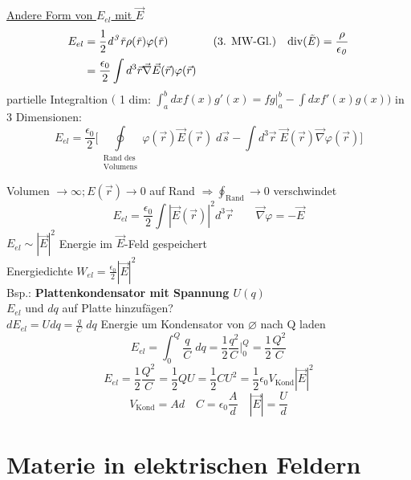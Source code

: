 \documentclass[titlepage,12pt,a4paper,ngerman]{report}
\newcommand{\tx}[1]{\textrm{#1}}
\begin{document}
\underline{Andere Form von $E_{el}$ mit $ \vec{E}$}
\begin{align*}
E_{el} &= \frac{1}{2} \it d^3\vec{r} \rho(\vec{r}) \varphi(\vec{r}) \qquad \qquad \tx{(3. MW-Gl.)} \quad \tx{div}(\vec{E}) = \frac{\rho}{\epsilon_0}\\
&= \frac{\epsilon_0}{2} \int d^3 \vec{r} \vec{\nabla} \vec{E}(\vec{r}) \varphi(\vec{r})
\end{align*}
partielle Integraltion $\bigg($ 1 dim: $\int_a^b dx f(x) g'(x) = fg \bigg \vert _a^b - \int dx f'(x) g(x) \bigg)$
in 3 Dimensionen:
$$ E_{el}= \frac{\epsilon_0}{2} \bigg[ \oint \limits _{\substack{\tx{Rand des} \\ \tx{Volumens}}} \varphi(\vec{r}) \vec{E}(\vec{r}) \; d\vec{s} - \int d^3\vec{r}\; \vec{E}(\vec{r}) \vec{\nabla} \varphi(\vec{r}) \bigg]$$

Volumen $\rightarrow \infty ; E(\vec{r}) \rightarrow 0$ auf Rand $ \Rightarrow \oint_{\tx{Rand}} \rightarrow 0 $ verschwindet
$$E_{el} = \frac{\epsilon_0}{2} \int |\vec{E}(\vec{r})|^2 d^3 \vec{r}\qquad \vec{\nabla} \varphi = - \vec{E}$$
$E_{el} \sim |\vec{E}|^2$ Energie im $\vec{E}$-Feld gespeichert\\
Energiedichte $W_{el} = \frac{\epsilon_0}{2} | \vec{E}| ^2$\\[10pt]
Bsp.: \textbf{Plattenkondensator mit Spannung $U(q)$}\\
$E_{el}$ und $dq$ auf Platte hinzufägen? \\
$dE_{el} = U dq = \frac{q}{C} \; dq$
Energie um Kondensator von $\varnothing$ nach Q laden
$$E_{el} = \int ^Q _0 \frac{q}{C} \; dq = \frac{1}{2} \frac{q^2}{C} |_0^Q = \frac{1}{2} \frac{Q^2}{C}$$
$$\boxed{E_{el} = \frac{1}{2} \frac{Q^2}{C} = \frac{1}{2} Q U = \frac{1}{2} C U^2 = \frac{1}{2} \epsilon_0 V_{\tx{Kond}} |\vec{E}|^2}$$
$$V_{\tx{Kond}} = Ad \quad C= \epsilon_0 \frac{A}{d} \quad |\vec{E}| = \frac{U}{d}$$

\section{Materie in elektrischen Feldern}
\end{document}
